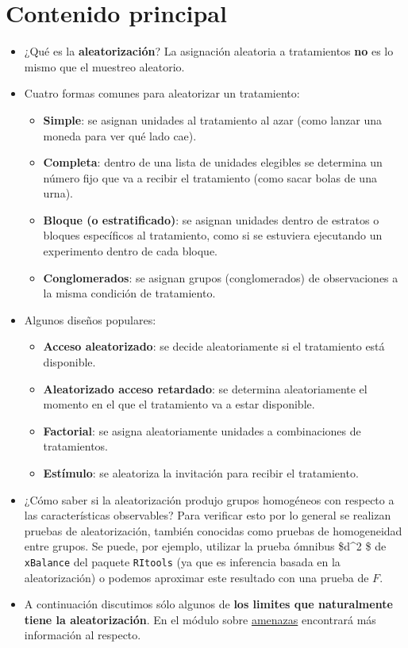 \documentclass[
  12pt,
  spanish,
]{book}
\begin{document}
\hypertarget{contenido-principal-2}{%
\section{Contenido principal}\label{contenido-principal-2}}

\begin{itemize}
\item
  ¿Qué es la \textbf{aleatorización}? La asignación aleatoria a tratamientos \textbf{no} es lo mismo que el muestreo aleatorio.
\item
  Cuatro formas comunes para aleatorizar un tratamiento:

  \begin{itemize}
  \item
    \textbf{Simple}: se asignan unidades al tratamiento al azar (como lanzar una moneda para ver qué lado cae).
  \item
    \textbf{Completa}: dentro de una lista de unidades elegibles se determina un número fijo que va a recibir el tratamiento (como sacar bolas de una urna).
  \item
    \textbf{Bloque (o estratificado)}: se asignan unidades dentro de estratos o bloques específicos al tratamiento, como si se estuviera ejecutando un experimento dentro de cada bloque.
  \item
    \textbf{Conglomerados}: se asignan grupos (conglomerados) de observaciones a la misma condición de tratamiento.
  \end{itemize}
\item
  Algunos diseños populares:

  \begin{itemize}
  \item
    \textbf{Acceso aleatorizado}: se decide aleatoriamente si el tratamiento está disponible.
  \item
    \textbf{Aleatorizado acceso retardado}: se determina aleatoriamente el momento en el que el tratamiento va a estar disponible.
  \item
    \textbf{Factorial}: se asigna aleatoriamente unidades a combinaciones de tratamientos.
  \item
    \textbf{Estímulo}: se aleatoriza la invitación para recibir el tratamiento.
  \end{itemize}
\item
  ¿Cómo saber si la aleatorización produjo grupos homogéneos con respecto a las características observables? Para verificar esto por lo general se realizan pruebas de aleatorización, también conocidas como pruebas de homogeneidad entre grupos. Se puede, por ejemplo, utilizar la prueba ómnibus \$d\^{}2 \$ de \texttt{xBalance} del paquete \texttt{RItools} (ya que es inferencia basada en la aleatorización) o podemos aproximar este resultado con una prueba de \(F\).
\item
  A continuación discutimos sólo algunos de \textbf{los limites que naturalmente tiene la aleatorización}. En el módulo sobre \href{threats-to-internal-validity-of-randomized-experiments.html}{amenazas} encontrará más información al respecto.
\end{itemize}
\end{document}
